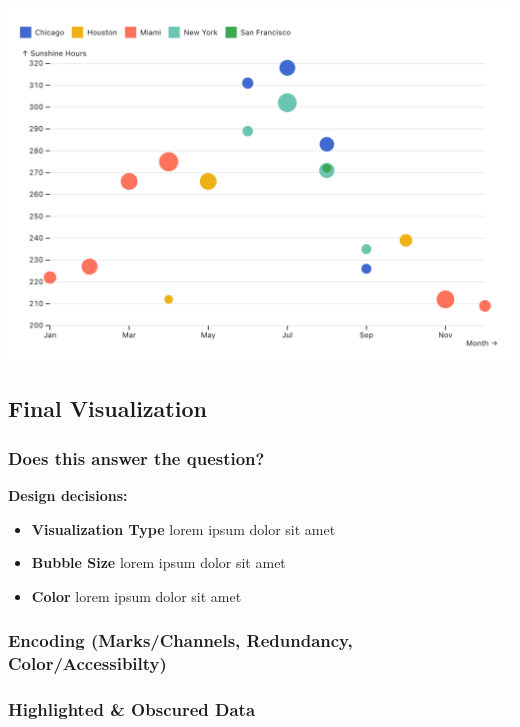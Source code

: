 \documentclass{article}
\begin{document}
\begin{center}
    \includegraphics[scale=0.2]{bubble.png}
\end{center}

\pagebreak

\subsection{Final Visualization}



\subsubsection{Does this answer the question?}

\textbf{Design decisions:}
\begin{itemize}
    \item \textbf{Visualization Type} lorem ipsum dolor sit amet  
    \item \textbf{Bubble Size} lorem ipsum dolor sit amet
    \item \textbf{Color} lorem ipsum dolor sit amet
\end{itemize}

\subsubsection{Encoding (Marks/Channels, Redundancy, Color/Accessibilty)}
\subsubsection{Highlighted \& Obscured Data}
\end{document}
